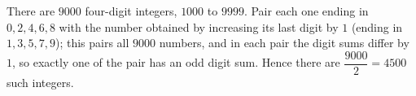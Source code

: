 There are $9000$ four-digit integers, $1000$ to $9999$. Pair each one ending in $0,2,4,6,8$ with the number obtained by increasing its last digit by $1$ (ending in $1,3,5,7,9$); this pairs all $9000$ numbers, and in each pair the digit sums differ by $1$, so exactly one of the pair has an odd digit sum. Hence there are $\dfrac{9000}{2}=\boxed{4500}$ such integers.
